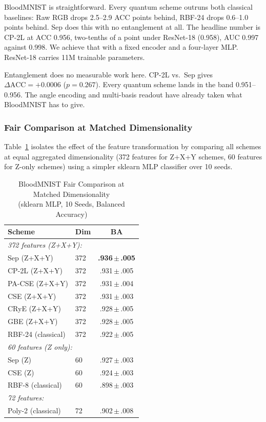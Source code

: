 \documentclass[conference,compsoc]{IEEEtran}
\begin{document}
BloodMNIST is straightforward. Every quantum scheme outruns both classical baselines: Raw RGB drops 2.5--2.9 ACC points behind, RBF-24 drops 0.6--1.0 points behind. Sep does this with no entanglement at all. The headline number is CP-2L at ACC 0.956, two-tenths of a point under ResNet-18 (0.958), AUC 0.997 against 0.998. We achieve that with a fixed encoder and a four-layer MLP. ResNet-18 carries 11M trainable parameters.

Entanglement does no measurable work here. CP-2L vs.\ Sep gives $\Delta\text{ACC} = +0.0006$ ($p = 0.267$). Every quantum scheme lands in the band 0.951--0.956. The angle encoding and multi-basis readout have already taken what BloodMNIST has to give.

\subsubsection{Fair Comparison at Matched Dimensionality}

Table~\ref{tab:blood_fair} isolates the effect of the feature transformation by comparing all schemes at equal aggregated dimensionality (372 features for Z+X+Y schemes, 60 features for Z-only schemes) using a simpler sklearn MLP classifier over 10 seeds.

\begin{table}[t]
\renewcommand{\arraystretch}{1.15}
\caption{BloodMNIST Fair Comparison at Matched Dimensionality\\(sklearn MLP, 10 Seeds, Balanced Accuracy)}
\label{tab:blood_fair}
\centering
\begin{tabular}{llc}
\toprule
Scheme & Dim & BA \\
\midrule
\multicolumn{3}{l}{\textit{372 features (Z+X+Y):}} \\
\quad Sep (Z+X+Y) & 372 & \textbf{.936\,$\pm$\,.005} \\
\quad CP-2L (Z+X+Y) & 372 & .931\,$\pm$\,.005 \\
\quad PA-CSE (Z+X+Y) & 372 & .931\,$\pm$\,.004 \\
\quad CSE (Z+X+Y) & 372 & .931\,$\pm$\,.003 \\
\quad CRyE (Z+X+Y) & 372 & .928\,$\pm$\,.005 \\
\quad GBE (Z+X+Y) & 372 & .928\,$\pm$\,.005 \\
\quad RBF-24 (classical) & 372 & .922\,$\pm$\,.005 \\
\midrule
\multicolumn{3}{l}{\textit{60 features (Z only):}} \\
\quad Sep (Z) & 60 & .927\,$\pm$\,.003 \\
\quad CSE (Z) & 60 & .924\,$\pm$\,.003 \\
\quad RBF-8 (classical) & 60 & .898\,$\pm$\,.003 \\
\midrule
\multicolumn{3}{l}{\textit{72 features:}} \\
\quad Poly-2 (classical) & 72 & .902\,$\pm$\,.008 \\
\bottomrule
\end{tabular}
\end{table}
\end{document}
